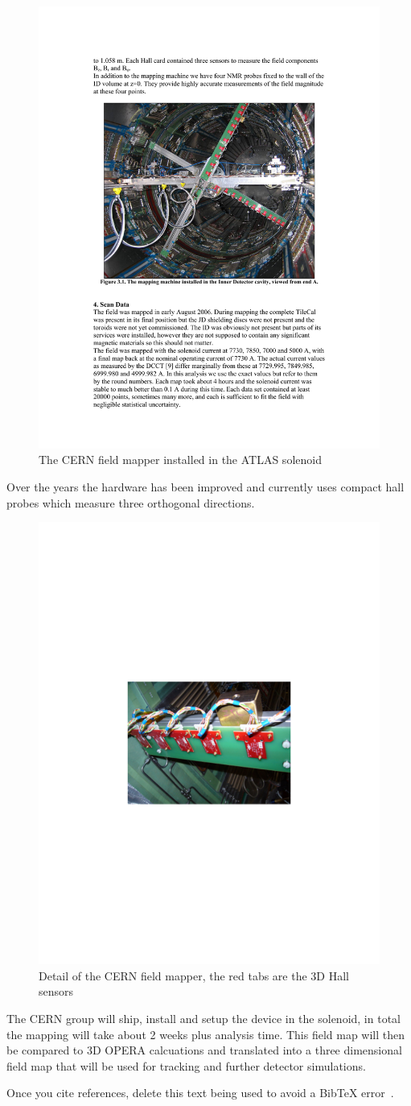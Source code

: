 \begin{figure}[]
  \begin{center}
    \includegraphics[width=0.5\linewidth, height=0.4\textwidth]{figs/CERNMapper.pdf}
    \caption{The CERN field mapper installed in the ATLAS solenoid}
    \label{CERNMapper}
  \end{center}
\end{figure}

Over the years the hardware has been improved and currently uses
compact hall probes which measure three orthogonal directions.  

\begin{figure}[]
  \begin{center}
    \includegraphics[width=0.5\linewidth, height=0.3\textwidth]{figs/CERNMapperDetail.pdf}
    \caption{Detail of the CERN field mapper, the red tabs are the 3D
    Hall sensors}
    \label{CERNMapperDetail}
  \end{center}
\end{figure}

The CERN group will ship, install and setup the device in the
solenoid, in total the mapping will take about 2 weeks plus analysis
time. This field map will then be compared to 3D OPERA calcuations and
translated into a three dimensional field map that will be used for
tracking and further detector simulations.

Once you cite references, delete this text being used
to avoid a BibTeX error~\cite{Adare:2999ux}.